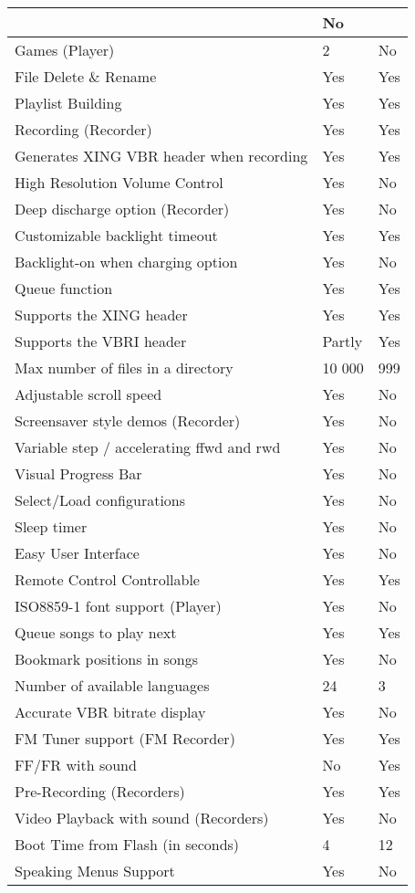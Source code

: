 \begin{tabular}[c]{|p{10.382cm}|p{2.799cm}|p{2.411cm}|}
&
No 
\\\hline
Games (Player) 
&
2 
&
No 
\\\hline
File Delete \& Rename 
&
Yes 
&
Yes 
\\\hline
Playlist Building 
&
Yes 
&
Yes 
\\\hline
Recording (Recorder) 
&
Yes 
&
Yes 
\\\hline
Generates XING VBR header when recording 
&
Yes 
&
Yes 
\\\hline
High Resolution Volume Control 
&
Yes 
&
No 
\\\hline
Deep discharge option (Recorder) 
&
Yes 
&
No 
\\\hline
Customizable backlight timeout 
&
Yes 
&
Yes 
\\\hline
Backlight{}-on when charging option 
&
Yes 
&
No 
\\\hline
Queue function 
&
Yes 
&
Yes 
\\\hline
Supports the XING header 
&
Yes 
&
Yes 
\\\hline
Supports the VBRI header 
&
Partly 
&
Yes 
\\\hline
Max number of files in a directory
&
10 000 
&
999 
\\\hline
Adjustable scroll speed 
&
Yes 
&
No 
\\\hline
Screensaver style demos (Recorder) 
&
Yes 
&
No 
\\\hline
Variable step / accelerating ffwd and rwd 
&
Yes 
&
No 
\\\hline
Visual Progress Bar 
&
Yes 
&
No 
\\\hline
Select/Load configurations
&
Yes 
&
No 
\\\hline
Sleep timer 
&
Yes 
&
No 
\\\hline
Easy User Interface 
&
Yes 
&
No 
\\\hline
Remote Control Controllable 
&
Yes 
&
Yes 
\\\hline
ISO8859{}-1 font support (Player) 
&
Yes 
&
No 
\\\hline
Queue songs to play next 
&
Yes 
&
Yes 
\\\hline
Bookmark positions in songs 
&
Yes 
&
No 
\\\hline
Number of available languages 
&
24 
&
3 
\\\hline
Accurate VBR bitrate display 
&
Yes 
&
No 
\\\hline
FM Tuner support (FM Recorder) 
&
Yes 
&
Yes 
\\\hline
FF/FR with sound 
&
No 
&
Yes 
\\\hline
Pre{}-Recording (Recorders) 
&
Yes 
&
Yes 
\\\hline
Video Playback with sound (Recorders) 
&
Yes 
&
No 
\\\hline
Boot Time from Flash (in seconds) 
&
4 
&
12 
\\\hline
Speaking Menus Support 
&
Yes 
&
No 
\\\hline
\end{tabular}

